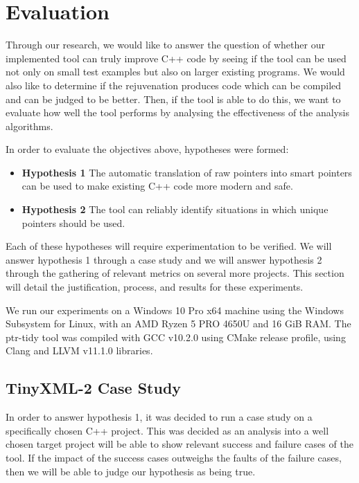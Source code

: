 \documentclass{mpaper}
\begin{document}


    \section{Evaluation}\label{sec:evaluation}
    
    Through our research, we would like to answer the question of whether our implemented tool can truly improve C++ code by seeing if the tool can be used not only on small test examples but also on larger existing programs. We would also like to determine if the rejuvenation produces code which can be compiled and can be judged to be better.
    Then, if the tool is able to do this, we want to evaluate how well the tool performs by analysing the effectiveness of the analysis algorithms.

    In order to evaluate the objectives above, hypotheses were formed:
    
    \begin{itemize}
        \item \textbf{Hypothesis 1} The automatic translation of raw pointers into smart pointers can be used to make existing C++ code more modern and safe.
        \item \textbf{Hypothesis 2} The tool can reliably identify situations in which unique pointers should be used.
    \end{itemize}
    
    Each of these hypotheses will require experimentation to be verified.
    We will answer hypothesis 1 through a case study and we will answer hypothesis 2 through the gathering of relevant metrics on several more projects.
    This section will detail the justification, process, and results for these experiments.
    
    We run our experiments on a Windows 10 Pro x64 machine using the Windows Subsystem for Linux, with an AMD Ryzen 5 PRO 4650U and 16 GiB RAM.
    The ptr-tidy tool was compiled with GCC v10.2.0 using CMake release profile, using Clang and LLVM v11.1.0 libraries.

    \subsection{TinyXML-2 Case Study}\label{subsec:case-study}
    
    In order to answer hypothesis 1, it was decided to run a case study on a specifically chosen C++ project.
    This was decided as an analysis into a well chosen target project will be able to show relevant success and failure cases of the tool.
    If the impact of the success cases outweighs the faults of the failure cases, then we will be able to judge our hypothesis as being true.
    
\end{document}
